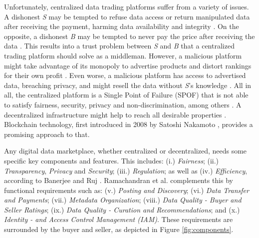 Unfortunately, centralized data trading platforms suffer from a variety of issues. A dishonest \emph{S} may be tempted to refuse data access or return manipulated data after receiving the payment, harming data availability and integrity \cite{suBDTFBlockchainBasedData2020,lawrenzBlockchainTechnologyApproach2019}. On the opposite, a dishonest \emph{B} may be tempted to never pay the price after receiving the data \cite{lawrenzBlockchainTechnologyApproach2019}. This results into a trust problem between \emph{S} and \emph{B} that a centralized trading platform should solve as a middleman. However, a malicious platform might take advantage of its monopoly to advertise products and distort rankings for their own profit \cite{ramachandranDecentralizedDataMarketplace2018}. Even worse, a malicious platform has access to advertised data, breaching privacy, \cite{banerjeeBlockchainEnabledData2019} and might resell the data without \emph{S}'s knowledge \cite{serranoPeertoPeerOwnershipPreservingData2021,suBDTFBlockchainBasedData2020,daiSDTESecureBlockchainBased2020}. All in all, the centralized platform is a Single Point of Failure (SPOF) \cite{daiSDTESecureBlockchainBased2020} that is not able to satisfy fairness, security, privacy and non-discrimination, among others \cite{banerjeeBlockchainEnabledData2019}. A decentralized infrastructure might help to reach all desirable properties \cite{ramachandranDecentralizedDataMarketplace2018}. Blockchain technology, first introduced in 2008 by Satoshi Nakamoto \cite{nakamotoBitcoinPeertoPeerElectronic}, provides a promising approach to that.

Any digital data marketplace, whether centralized or decentralized, needs some specific key components and features. This includes: (i.) \emph{Fairness}; (ii.) \emph{Transparency}, \emph{Privacy} and \emph{Security}; (iii.) \emph{Regulation}; as well as (iv.) \emph{Efficiency}, according to Banerjee and Ruj \cite{banerjeeBlockchainEnabledData2019}. Ramachandran et al. \cite{ramachandranDecentralizedDataMarketplace2018} complements this by functional requirements such as: (v.) \emph{Posting and Discovery}; (vi.) \emph{Data Transfer and Payments}; (vii.) \emph{Metadata Organization}; (viii.) \emph{Data Quality - Buyer and Seller
Ratings}; (ix.) \emph{Data Quality - Curation and Recommendations}; and (x.) \emph{Identity - and Access Control Management (IAM)}. These requirements are surrounded by the buyer and seller, as depicted in Figure \ref{fig:components}.

